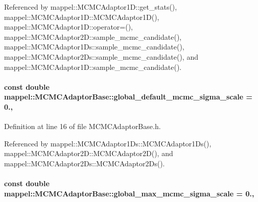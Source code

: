 Referenced by mappel\+::\+M\+C\+M\+C\+Adaptor1\+D\+::get\+\_\+stats(), mappel\+::\+M\+C\+M\+C\+Adaptor1\+D\+::\+M\+C\+M\+C\+Adaptor1\+D(), mappel\+::\+M\+C\+M\+C\+Adaptor1\+D\+::operator=(), mappel\+::\+M\+C\+M\+C\+Adaptor2\+D\+::sample\+\_\+mcmc\+\_\+candidate(), mappel\+::\+M\+C\+M\+C\+Adaptor1\+Ds\+::sample\+\_\+mcmc\+\_\+candidate(), mappel\+::\+M\+C\+M\+C\+Adaptor2\+Ds\+::sample\+\_\+mcmc\+\_\+candidate(), and mappel\+::\+M\+C\+M\+C\+Adaptor1\+D\+::sample\+\_\+mcmc\+\_\+candidate().

\paragraph[{\texorpdfstring{global\+\_\+default\+\_\+mcmc\+\_\+sigma\+\_\+scale}{global_default_mcmc_sigma_scale}}]{\setlength{\rightskip}{0pt plus 5cm}const double mappel\+::\+M\+C\+M\+C\+Adaptor\+Base\+::global\+\_\+default\+\_\+mcmc\+\_\+sigma\+\_\+scale = 0.\hspace{0.3cm}{\ttfamily [static]}, {\ttfamily [inherited]}}\hypertarget{classmappel_1_1MCMCAdaptorBase_a44cebca0e27135c854fa8430d2d89929}{}\label{classmappel_1_1MCMCAdaptorBase_a44cebca0e27135c854fa8430d2d89929}


Definition at line 16 of file M\+C\+M\+C\+Adaptor\+Base.\+h.



Referenced by mappel\+::\+M\+C\+M\+C\+Adaptor1\+Ds\+::\+M\+C\+M\+C\+Adaptor1\+Ds(), mappel\+::\+M\+C\+M\+C\+Adaptor2\+D\+::\+M\+C\+M\+C\+Adaptor2\+D(), and mappel\+::\+M\+C\+M\+C\+Adaptor2\+Ds\+::\+M\+C\+M\+C\+Adaptor2\+Ds().

\paragraph[{\texorpdfstring{global\+\_\+max\+\_\+mcmc\+\_\+sigma\+\_\+scale}{global_max_mcmc_sigma_scale}}]{\setlength{\rightskip}{0pt plus 5cm}const double mappel\+::\+M\+C\+M\+C\+Adaptor\+Base\+::global\+\_\+max\+\_\+mcmc\+\_\+sigma\+\_\+scale = 0.\hspace{0.3cm}{\ttfamily [static]}, {\ttfamily [inherited]}}\hypertarget{classmappel_1_1MCMCAdaptorBase_aebc93881ca351e67de867238a62579eb}{}\label{classmappel_1_1MCMCAdaptorBase_aebc93881ca351e67de867238a62579eb}



